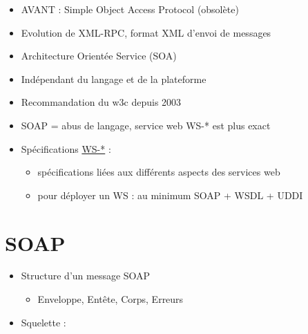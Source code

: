 \begin{itemize}
\tightlist
\item
  AVANT : Simple Object Access Protocol (obsolète)
\item
  Evolution de XML-RPC, format XML d'envoi de messages
\item
  Architecture Orientée Service (SOA)
\item
  Indépendant du langage et de la plateforme
\item
  Recommandation du w3c depuis 2003
\item
  SOAP = abus de langage, service web WS-* est plus exact
\item
  Spécifications
  \href{https://en.wikipedia.org/wiki/List_of_web_service_specifications}{WS-*}
  :

  \begin{itemize}
  \tightlist
  \item
    spécifications liées aux différents aspects des services web
  \item
    pour déployer un WS : au minimum SOAP + WSDL + UDDI
  \end{itemize}
\end{itemize}

\hypertarget{soap-1}{%
\section{SOAP}\label{soap-1}}

\begin{itemize}
\tightlist
\item
  Structure d'un message SOAP

  \begin{itemize}
  \tightlist
  \item
    Enveloppe, Entête, Corps, Erreurs
  \end{itemize}
\item
  Squelette :
\end{itemize}

\begin{otherlanguage}{english}

\begin{Shaded}
\begin{Highlighting}[]
\KeywordTok{>}
\end{Highlighting}
\end{Shaded}

\end{otherlanguage}

